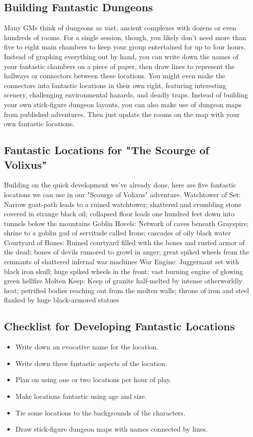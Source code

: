 \documentclass[10pt,a4paper,twoside,bg=print,twocolumn,openany,nodeprecatedcode]{dndbook}
\begin{document}
\subsection{Building Fantastic Dungeons}
Many GMs think of dungeons as vast, ancient complexes with dozens or even hundreds of rooms. For a single session, though, you likely don't need more than five to eight main chambers to keep your group entertained for up to four hours. Instead of graphing everything out by hand, you can write down the names of your fantastic chambers on a piece of paper, then draw lines to represent the hallways or connectors between these locations. You might even make the connectors into fantastic locations in their own right, featuring interesting scenery, challenging environmental hazards, and deadly traps.
Instead of building your own stick-figure dungeon layouts, you can also make use of dungeon maps from published adventures. Then just update the rooms on the map with your own fantastic locations.
\subsection{Fantastic Locations for "The Scourge of Volixus"}
Building on the quick development we've already done, here are five fantastic locations we can use in our "Scourge of Volixus" adventure.
Watchtower of Set: Narrow goat-path leads to a ruined watchtower; shattered and crumbling stone covered in strange black oil; collapsed floor leads one hundred feet down into tunnels below the mountains
Goblin Hovels: Network of caves beneath Grayspire; shrine to a goblin god of servitude called Irons; cascades of oily black water
Courtyard of Bones: Ruined courtyard filled with the bones and rusted armor of the dead; bones of devils rumored to growl in anger; great spiked wheels from the remnants of shattered infernal war machines
War Engine: Juggernaut set with black iron skull; huge spiked wheels in the front; vast burning engine of glowing green hellfire
Molten Keep: Keep of granite half-melted by intense otherworldly heat; petrified bodies reaching out from the molten walls; throne of iron and steel flanked by huge black-armored statues
\subsection{Checklist for Developing Fantastic Locations}

\begin{itemize}
\item Write down an evocative name for the location.
\item Write down three fantastic aspects of the location.
\item Plan on using one or two locations per hour of play.
\item Make locations fantastic using age and size.
\item Tie some locations to the backgrounds of the characters.
\item Draw stick-figure dungeon maps with names connected by lines.
\end{itemize}
\end{document}
